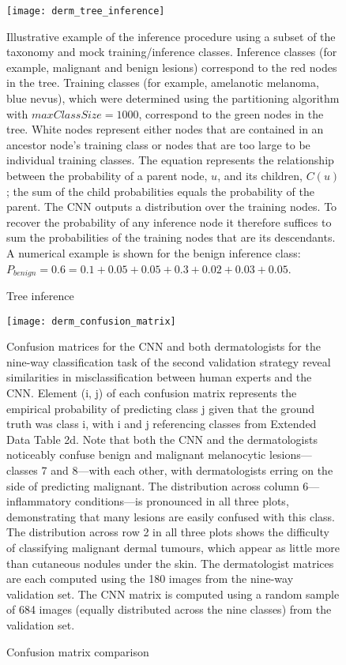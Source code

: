 \begin{figure}
\texttt{[image: derm\_tree\_inference]}
\caption{Tree inference}
\vspace{12px}
Illustrative example of the inference procedure using a subset of the taxonomy and mock training/inference classes. Inference classes (for example, malignant and benign lesions) correspond to the red nodes in the tree. Training classes (for example, amelanotic melanoma, blue nevus), which were determined using the partitioning algorithm with $maxClassSize = 1000$, correspond to the green nodes in the tree. White nodes represent either nodes that are contained in an ancestor node’s training class or nodes that are too large to be individual training classes. The equation represents the relationship between the probability of a parent node, $u$, and its children, $C(u)$; the sum of the child probabilities equals the probability of the parent. The CNN outputs a distribution over the training nodes. To recover the probability of any inference node it therefore suffices to sum the probabilities of the training nodes that are its descendants. A numerical example is shown for the benign inference class: $P_{benign} = 0.6 = 0.1 + 0.05 + 0.05 + 0.3 + 0.02 + 0.03 + 0.05$.
\label{fig:derm_tree_inference}
\end{figure}

\begin{figure}
\texttt{[image: derm\_confusion\_matrix]}
\caption{Confusion matrix comparison}
\vspace{12px}
Confusion matrices for the CNN and both dermatologists for the nine-way classification task of the second validation strategy reveal similarities in misclassification between human experts and the CNN. Element (i, j) of each confusion matrix represents the empirical probability of predicting class j given that the ground truth was class i, with i and j referencing classes from Extended Data Table 2d. Note that both the CNN and the dermatologists noticeably confuse benign and malignant melanocytic lesions—classes 7 and 8—with each other, with dermatologists erring on the side of predicting malignant. The distribution across column 6—inflammatory conditions—is pronounced in all three plots, demonstrating that many lesions are easily confused with this class. The distribution across row 2 in all three plots shows the difficulty of classifying malignant dermal tumours, which appear as little more than cutaneous nodules under the skin. The dermatologist matrices are each computed using the 180 images from the nine-way validation set. The CNN matrix is computed using a random sample of 684 images (equally distributed across the nine classes) from the validation set.
\label{fig:derm_confusion_matrix}
\end{figure}

